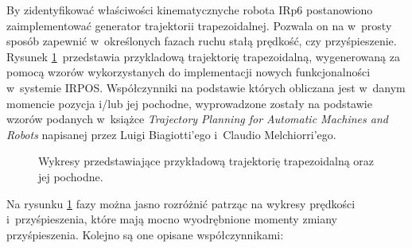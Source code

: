 \documentclass[a4paper, 12pt]{article}
\begin{document}
	By zidentyfikować właściwości kinematycznyche robota IRp6 postanowiono zaimplementować generator trajektorii trapezoidalnej. Pozwala on na w~prosty sposób zapewnić w~określonych fazach ruchu stałą prędkość, czy przyśpieszenie. Rysunek \ref{fig:trajtrapez}~przedstawia przykladową trajektorię trapezoidalną, wygenerowaną za pomocą wzorów wykorzystanych do implementacji nowych funkcjonalności w~systemie IRPOS. Współczynniki na podstawie których obliczana jest w~danym momencie pozycja i/lub jej pochodne, wyprowadzone zostały na podstawie wzorów podanych w~książce \textit{Trajectory Planning for Automatic Machines and Robots} napisanej przez Luigi Biagiotti'ego i~Claudio Melchiorri'ego.
	\begin{figure}[H]
	\centering
	\caption{Wykresy przedstawiające przykładową trajektorię trapezoidalną oraz jej pochodne.}
	\label{fig:trajtrapez}
	\end{figure}
	\par Na rysunku \ref{fig:trajtrapez} fazy można jasno rozróżnić patrząc na wykresy prędkości i~przyśpieszenia, które mają mocno wyodrębnione momenty zmiany przyśpieszenia. Kolejno są one opisane współczynnikami:
\end{document}
